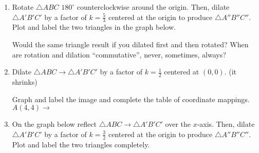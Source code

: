 \begin{enumerate}
\item Rotate $\triangle ABC$ $180^\circ$ counterclockwise around the origin. Then, dilate $\triangle A'B'C'$ by a factor of $\displaystyle k=\frac{5}{3}$ centered at the origin to produce $\triangle A''B''C''$. Plot and label the two triangles in the graph below.
\begin{center}
\end{center}
Would the same triangle result if you dilated first and then rotated? When are rotation and dilation ``commutative'', never, sometimes, always?

\newpage
\item Dilate $\triangle ABC \rightarrow \triangle A'B'C'$ by a factor of $k=\frac{1}{2}$ centered at $(0,0)$. (it shrinks)
  \begin{multicols}{2}
    Graph and label the image and complete the table of coordinate mappings.\\[0.5cm]
    $A(4,4) \rightarrow $ \vspace{3cm}
  \end{multicols}

\item On the graph below reflect $\triangle ABC \rightarrow \triangle A'B'C'$ over the $x$-axis. Then, dilate $\triangle A'B'C'$ by a factor of $\displaystyle k=\frac{3}{2}$ centered at the origin to produce $\triangle A''B''C''$. Plot and label the two triangles completely.
  \begin{center}
  \end{center}


\end{enumerate}
